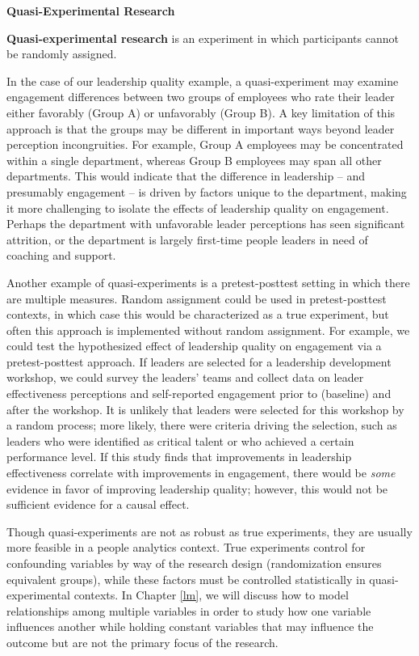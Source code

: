 \documentclass[
]{book}
\begin{document}
\textbf{Quasi-Experimental Research}

\textbf{Quasi-experimental research} is an experiment in which participants cannot be randomly assigned.

In the case of our leadership quality example, a quasi-experiment may examine engagement differences between two groups of employees who rate their leader either favorably (Group A) or unfavorably (Group B). A key limitation of this approach is that the groups may be different in important ways beyond leader perception incongruities. For example, Group A employees may be concentrated within a single department, whereas Group B employees may span all other departments. This would indicate that the difference in leadership -- and presumably engagement -- is driven by factors unique to the department, making it more challenging to isolate the effects of leadership quality on engagement. Perhaps the department with unfavorable leader perceptions has seen significant attrition, or the department is largely first-time people leaders in need of coaching and support.

Another example of quasi-experiments is a pretest-posttest setting in which there are multiple measures. Random assignment could be used in pretest-posttest contexts, in which case this would be characterized as a true experiment, but often this approach is implemented without random assignment. For example, we could test the hypothesized effect of leadership quality on engagement via a pretest-posttest approach. If leaders are selected for a leadership development workshop, we could survey the leaders' teams and collect data on leader effectiveness perceptions and self-reported engagement prior to (baseline) and after the workshop. It is unlikely that leaders were selected for this workshop by a random process; more likely, there were criteria driving the selection, such as leaders who were identified as critical talent or who achieved a certain performance level. If this study finds that improvements in leadership effectiveness correlate with improvements in engagement, there would be \emph{some} evidence in favor of improving leadership quality; however, this would not be sufficient evidence for a causal effect.

Though quasi-experiments are not as robust as true experiments, they are usually more feasible in a people analytics context. True experiments control for confounding variables by way of the research design (randomization ensures equivalent groups), while these factors must be controlled statistically in quasi-experimental contexts. In Chapter \ref{lm}, we will discuss how to model relationships among multiple variables in order to study how one variable influences another while holding constant variables that may influence the outcome but are not the primary focus of the research.
\end{document}
